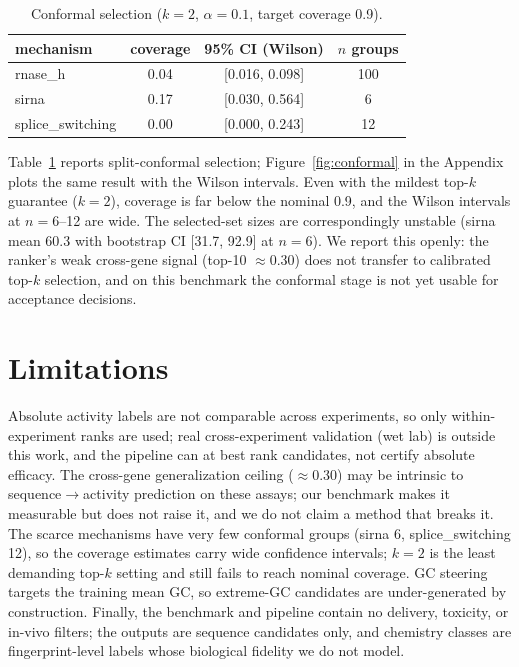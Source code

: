 \documentclass{article} %
\begin{document}
\begin{table}[t]
\centering
\begin{tabular}{lccc}
\toprule
mechanism & coverage & 95\% CI (Wilson) & $n$ groups \\
\midrule
rnase\_h & 0.04 & [0.016, 0.098] & 100 \\
sirna & 0.17 & [0.030, 0.564] & 6 \\
splice\_switching & 0.00 & [0.000, 0.243] & 12 \\
\bottomrule
\end{tabular}
\caption{Conformal selection ($k{=}2$, $\alpha{=}0.1$, target coverage 0.9).}
\label{tab:conformal}
\end{table}

Table~\ref{tab:conformal} reports split-conformal selection; Figure~\ref{fig:conformal} in the Appendix plots the same result with the Wilson intervals. Even with the mildest top-$k$ guarantee ($k{=}2$), coverage is far below the nominal 0.9, and the Wilson intervals at $n{=}6$--12 are wide. The selected-set sizes are correspondingly unstable (sirna mean 60.3 with bootstrap CI [31.7, 92.9] at $n{=}6$). We report this openly: the ranker's weak cross-gene signal (top-10 $\approx 0.30$) does not transfer to calibrated top-$k$ selection, and on this benchmark the conformal stage is not yet usable for acceptance decisions.

\section{Limitations}

Absolute activity labels are not comparable across experiments, so only within-experiment ranks are used; real cross-experiment validation (wet lab) is outside this work, and the pipeline can at best rank candidates, not certify absolute efficacy. The cross-gene generalization ceiling ($\approx$0.30) may be intrinsic to sequence$\rightarrow$activity prediction on these assays; our benchmark makes it measurable but does not raise it, and we do not claim a method that breaks it. The scarce mechanisms have very few conformal groups (sirna 6, splice\_switching 12), so the coverage estimates carry wide confidence intervals; $k{=}2$ is the least demanding top-$k$ setting and still fails to reach nominal coverage. GC steering targets the training mean GC, so extreme-GC candidates are under-generated by construction. Finally, the benchmark and pipeline contain no delivery, toxicity, or in-vivo filters; the outputs are sequence candidates only, and chemistry classes are fingerprint-level labels whose biological fidelity we do not model.
\end{document}
